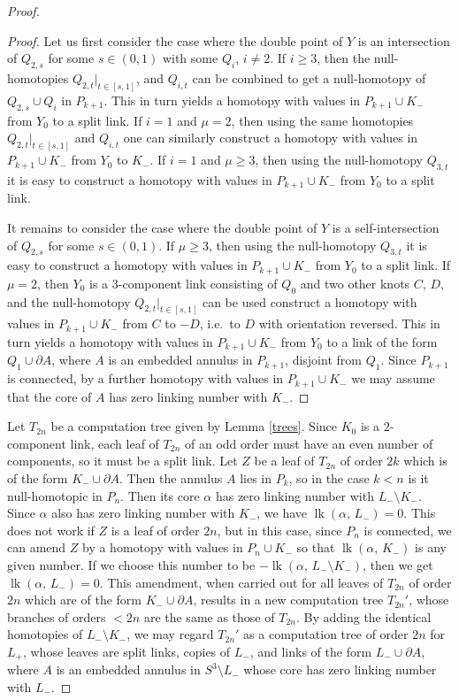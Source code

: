 \documentclass[a4paper,12pt,reqno,oneside]{amsart} %
\theoremstyle{plain}
\theoremstyle{definition}
\theoremstyle{named}
\def\but{\setminus}
\renewcommand{\:}{\colon}
\DeclareMathOperator{\lk}{lk}
\begin{document}
\begin{proof}
\begin{proof}
Let us first consider the case where the double point of $Y$ is an intersection of $Q_{2,s}$ for some $s\in(0,1)$ with 
some $Q_i$, $i\ne 2$.
If $i\ge 3$, then the null-homotopies $Q_{2,t}|_{t\in [s,1]}$, and $Q_{i,t}$ can be combined to get a null-homotopy 
of $Q_{2,s}\cup Q_i$ in $P_{k+1}$.
This in turn yields a homotopy with values in $P_{k+1}\cup K_-$ from $Y_0$ to a split link.
If $i=1$ and $\mu=2$, then using the same homotopies $Q_{2,t}|_{t\in [s,1]}$ and $Q_{i,t}$ one can similarly construct
a homotopy with values in $P_{k+1}\cup K_-$ from $Y_0$ to $K_-$.
If $i=1$ and $\mu\ge 3$, then using the null-homotopy $Q_{3,t}$ it is easy to construct a homotopy with values in $P_{k+1}\cup K_-$ 
from $Y_0$ to a split link.

It remains to consider the case where the double point of $Y$ is a self-intersection of $Q_{2,s}$ for some $s\in(0,1)$.
If $\mu\ge 3$, then using the null-homotopy $Q_{3,t}$ it is easy to construct a homotopy with values in $P_{k+1}\cup K_-$ 
from $Y_0$ to a split link.
If $\mu=2$, then $Y_0$ is a $3$-component link consisting of $Q_0$ and two other knots $C$, $D$, and
the null-homotopy $Q_{2,t}|_{t\in[s,1]}$ can be used construct a homotopy with values in $P_{k+1}\cup K_-$ from $C$ to $-D$,
i.e.\ to $D$ with orientation reversed.
This in turn yields a homotopy with values in $P_{k+1}\cup K_-$ from $Y_0$ to a link of the form $Q_1\cup\partial A$, where
$A$ is an embedded annulus in $P_{k+1}$, disjoint from $Q_1$.
Since $P_{k+1}$ is connected, by a further homotopy with values in $P_{k+1}\cup K_-$ we may assume that the core of $A$ has 
zero linking number with $K_-$. 
\end{proof}

Let $T_{2n}$ be a computation tree given by Lemma \ref{trees}.
Since $K_0$ is a $2$-component link, each leaf of $T_{2n}$ of an odd order must have an even number of components, so it must be a split link.
Let $Z$ be a leaf of $T_{2n}$ of order $2k$ which is of the form $K_-\cup\partial A$.
Then the annulus $A$ lies in $P_k$, so in the case $k<n$ is it null-homotopic in $P_n$.
Then its core $\alpha$ has zero linking number with $L_-\but K_-$.
Since $\alpha$ also has zero linking number with $K_-$, we have $\lk(\alpha,\,L_-)=0$.
This does not work if $Z$ is a leaf of order $2n$, but in this case, since $P_n$ is connected, we can amend $Z$ by a homotopy 
with values in $P_n\cup K_-$ so that $\lk(\alpha,\,K_-)$ is any given number.
If we choose this number to be $-\lk(\alpha,\,L_-\but K_-)$, then we get $\lk(\alpha,\,L_-)=0$.
This amendment, when carried out for all leaves of $T_{2n}$ of order $2n$ which are of the form $K_-\cup\partial A$, results in a new
computation tree $T_{2n}'$, whose branches of orders $<2n$ are the same as those of $T_{2n}$.
By adding the identical homotopies of $L_-\but K_-$, we may regard $T_{2n}'$ as a computation tree of order $2n$ for $L_+$, whose leaves 
are split links, copies of $L_-$, and links of the form $L_-\cup\partial A$, where $A$ is an embedded annulus in $S^3\but L_-$ whose core
has zero linking number with $L_-$. 


\end{proof}
\end{document}
